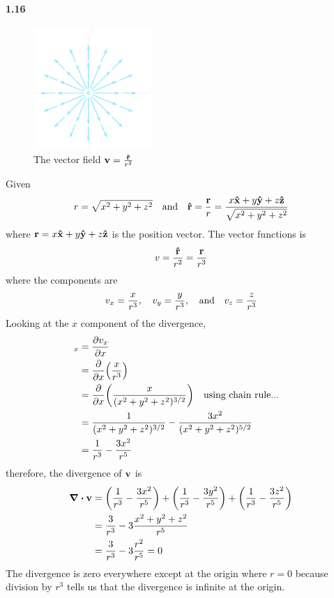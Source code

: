 \documentclass[../main.tex]{subfiles}
\begin{document}
\paragraph*{1.16}
\begin{figure}[ht]
    \centering
    \includegraphics[width=0.4\textwidth]{fighw1.png}
    \renewcommand{\thefigure}{1.16}
    \caption{The vector field $\vb v = \frac{\vu r}{r^2}$}
    \label{fig:1.16}
\end{figure}
Given
\begin{align*}
    r = \sqrt{x^2 + y^2 + z^2} \qand
    \vu{r} = \frac{\vb{r}}{r} = \frac{x\vu{x} + y\vu{y} + z\vu{z}}{\sqrt{x^2 + y^2 + z^2}}
\end{align*}
where $\vb{r} = x\vu{x} + y\vu{y} + z\vu{z}$ is the position vector. The vector functions is
\begin{align*}
    v = \frac{\vu{r}}{r^2} = \frac{\vb{r}}{r^3}
\end{align*}
where the components are
\begin{align*}
    v_x = \frac{x}{r^3}, \quad v_y = \frac{y}{r^3}, \qand v_z = \frac{z}{r^3}
\end{align*}
Looking at the $x$ component of the divergence,
\begin{align*}
    [\div{\vb{v}}]_x &= \pdv{v_x}{x} \\
    &= \pdv{x}(\frac{x}{r^3}) \\
    &= \pdv{x}(\frac{x}{(x^2 + y^2 + z^2)^{3/2}}) \qq{using chain rule...}\\
    &= \frac{1}{(x^2 + y^2 + z^2)^{3/2}} - \frac{3x^2}{(x^2 + y^2 + z^2)^{5/2}} \\
    &= \frac{1}{r^3} - \frac{3x^2}{r^5}
\end{align*}
therefore, the divergence of $\vb{v}$ is
\begin{align*}
    \div{\vb{v}} &= \quantity(\frac{1}{r^3} - \frac{3x^2}{r^5})
        + \quantity(\frac{1}{r^3} - \frac{3y^2}{r^5})
        + \quantity(\frac{1}{r^3} - \frac{3z^2}{r^5}) \\
    &= \frac{3}{r^3} - 3\frac{x^2 + y^2 + z^2}{r^5} \\
    &= \frac{3}{r^3} - 3\frac{r^2}{r^5} = 0
\end{align*}
The divergence is zero everywhere except at the origin where $r = 0$ because division by $r^3$ tells us that the divergence is infinite at the origin.
\end{document}
